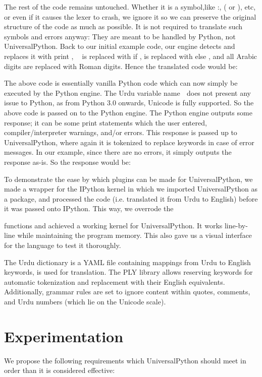 \documentclass[conference]{IEEEtran}
\begin{document}
The rest of the code remains untouched. Whether it is a symbol,like :, ( or ), etc, or even if it causes the lexer to crash, we ignore it so we can preserve the original structure of the code as much as possible. It is not required to translate such symbols and errors anyway: They are meant to be handled by Python, not UniversalPython. Back to our initial example code, our engine detects and replaces it with print , 􏰁􏰃 is replaced with if ,
is replaced with else , and all Arabic digits are replaced with Roman digits. Hence the translated code would be:

The above code is essentially vanilla Python code which can now simply be executed by the Python engine. The Urdu variable name 􏰀 does not present any issue to Python, as from Python 3.0 onwards, Unicode is fully supported. So the above code is passed on to the Python engine. The Python engine outputs some response; it can be some print statements which the user entered, compiler/interpreter warnings, and/or errors. This response is passed up to UniversalPython, where again it is tokenized to replace keywords in case of error messages. In our example, since there are no errors, it simply outputs the response as-is. So the response would be:

To demonstrate the ease by which plugins can be made for UniversalPython, we made a wrapper for the IPython kernel in which we imported UniversalPython as a package, and processed the code (i.e. translated it from Urdu to English) before it was passed onto IPython. This way, we overrode the

functions and achieved a working kernel for UniversalPython. It works line-by-line while maintaining the program memory. This also gave us a visual interface for the language to test it thoroughly.

The Urdu dictionary is a YAML file containing mappings from Urdu to English keywords, is used for translation. The PLY library allows reserving keywords for automatic tokenization and replacement with their English equivalents. Additionally, grammar rules are set to ignore content within quotes, comments, and Urdu numbers (which lie on the Unicode scale).

\section{Experimentation}

We propose the following requirements which UniversalPython should meet in order than it is considered effective:
\end{document}
